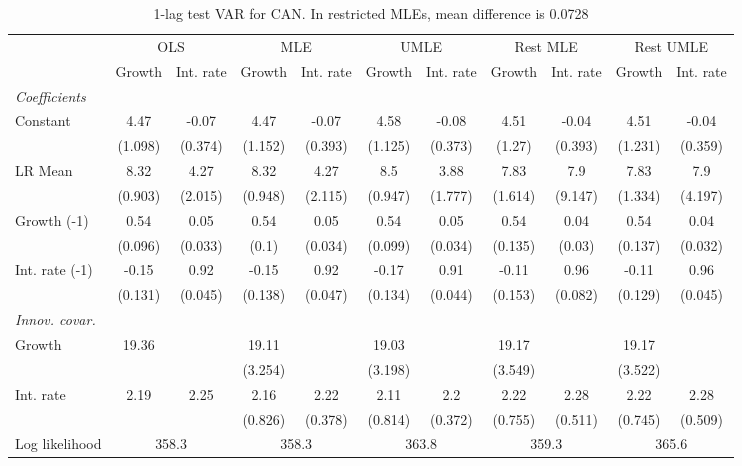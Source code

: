 \begin{table}[htbp] 
	\centering
	\begin{tabular}{@{\extracolsep{4pt}}lcccccccccc@{}}		\hline\hline
		 		 & \multicolumn{2}{c}{OLS} &\multicolumn{2}{c}{MLE} &\multicolumn{2}{c}{UMLE} &\multicolumn{2}{c}{Rest MLE} &\multicolumn{2}{c}{Rest UMLE} \\ 
 		 & Growth 	 & Int. rate 	 & Growth 	 & Int. rate 	 & Growth 	 & Int. rate 	 & Growth 	 & Int. rate 	 & Growth 	 & Int. rate\\\cline{2-3}\cline{4-5}\cline{6-7}\cline{8-9}\cline{10-11}
\rule{0pt}{4ex} 
 \emph{Coefficients} 	  		 & 		 & 		 & 		 & 		 & 		 & 		 & 		 & 		 & 		 &\\ 
\quad Constant 	 & 4.47 	 & -0.07 	 & 4.47 	 & -0.07 	 & 4.58 	 & -0.08 	 & 4.51 	 & -0.04 	 & 4.51 	 & -0.04	 \\ 
 		 & (1.098) 	 & (0.374) 	 & (1.152) 	 & (0.393) 	 & (1.125) 	 & (0.373) 	 & (1.27) 	 & (0.393) 	 & (1.231) 	 & (0.359) 	 \\ 
\quad LR Mean 	 & 8.32 	 & 4.27 	 & 8.32 	 & 4.27 	 & 8.5 	 & 3.88 	 & 7.83 	 & 7.9 	 & 7.83 	 & 7.9	 \\ 
 		 & (0.903) 	 & (2.015) 	 & (0.948) 	 & (2.115) 	 & (0.947) 	 & (1.777) 	 & (1.614) 	 & (9.147) 	 & (1.334) 	 & (4.197) 	 \\ 
\quad Growth (-1) 	 &0.54 	 & 0.05 	 & 0.54 	 & 0.05 	 & 0.54 	 & 0.05 	 & 0.54 	 & 0.04 	 & 0.54 	 & 0.04	 \\ 
 		 & (0.096) 	 & (0.033) 	 & (0.1) 	 & (0.034) 	 & (0.099) 	 & (0.034) 	 & (0.135) 	 & (0.03) 	 & (0.137) 	 & (0.032) 	 \\ 
\quad Int. rate (-1) 	 &-0.15 	 & 0.92 	 & -0.15 	 & 0.92 	 & -0.17 	 & 0.91 	 & -0.11 	 & 0.96 	 & -0.11 	 & 0.96	 \\ 
 		 & (0.131) 	 & (0.045) 	 & (0.138) 	 & (0.047) 	 & (0.134) 	 & (0.044) 	 & (0.153) 	 & (0.082) 	 & (0.129) 	 & (0.045) 	 \\ 
\rule{0pt}{4ex} \emph{Innov. covar.}  	 & 	 & 	 & 	 & 	 & 	 & 	 & 	 & 	 & 	 &\\ 
\quad Growth 	 &19.36 	 &  	 & 19.11 	 &  	 & 19.03 	 &  	 & 19.17 	 &  	 & 19.17 	 & 	 \\ 
 		 &  	 &  	 & (3.254) 	 &  	 & (3.198) 	 &  	 & (3.549) 	 &  	 & (3.522) 	 &  	 \\ 
\quad Int. rate 	 &2.19 	 & 2.25 	 & 2.16 	 & 2.22 	 & 2.11 	 & 2.2 	 & 2.22 	 & 2.28 	 & 2.22 	 & 2.28	 \\ 
 		 &  	 &  	 & (0.826) 	 & (0.378) 	 & (0.814) 	 & (0.372) 	 & (0.755) 	 & (0.511) 	 & (0.745) 	 & (0.509) 	 \\ 
 \hline \rule{0pt}{4ex} 
  Log likelihood 	 &\multicolumn{2}{c}{358.3} 	 & \multicolumn{2}{c}{358.3} 	 & \multicolumn{2}{c}{363.8} 	 & \multicolumn{2}{c}{359.3} 	 & \multicolumn{2}{c}{365.6}\\ 

 \hline 	\end{tabular}		\caption{1-lag test VAR for CAN. In restricted MLEs, mean difference is 0.0728}
		\label{tab:CAN1lag}

\end{table}